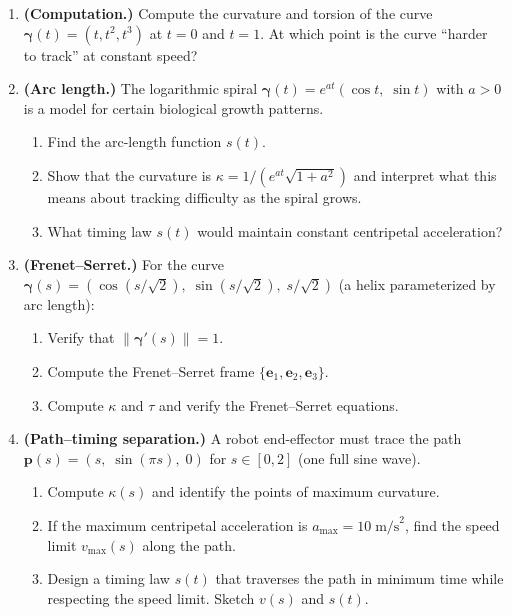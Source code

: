 \documentclass[12pt, openany]{book}
\theoremstyle{plain}
\newcommand{\traj}{\bm{\gamma}}
\newcommand{\norm}[1]{\left\lVert #1 \right\rVert}
\newcommand{\tangent}{\bm{e}_1}
\newcommand{\normal}{\bm{e}_2}
\newcommand{\binormal}{\bm{e}_3}
\begin{document}
\begin{enumerate}[label=\textbf{2.\arabic*.}, leftmargin=1.5cm]

\item \textbf{(Computation.)} Compute the curvature and torsion of the curve
  $\traj(t) = (t, t^2, t^3)$ at $t = 0$ and $t = 1$. At which point is the
  curve ``harder to track'' at constant speed?

\item \textbf{(Arc length.)} The logarithmic spiral $\traj(t) = e^{at}(\cos t,\;
  \sin t)$ with $a > 0$ is a model for certain biological growth patterns.
  \begin{enumerate}[label=(\alph*)]
    \item Find the arc-length function $s(t)$.
    \item Show that the curvature is $\kappa = 1/(e^{at}\sqrt{1 + a^2})$ and
      interpret what this means about tracking difficulty as the spiral grows.
    \item What timing law $s(t)$ would maintain constant centripetal acceleration?
  \end{enumerate}

\item \textbf{(Frenet--Serret.)} For the curve $\traj(s) = (\cos(s/\sqrt{2}),\;
  \sin(s/\sqrt{2}),\; s/\sqrt{2})$ (a helix parameterized by arc length):
  \begin{enumerate}[label=(\alph*)]
    \item Verify that $\norm{\traj'(s)} = 1$.
    \item Compute the Frenet--Serret frame $\{\tangent, \normal, \binormal\}$.
    \item Compute $\kappa$ and $\tau$ and verify the Frenet--Serret equations.
  \end{enumerate}

\item \textbf{(Path--timing separation.)} A robot end-effector must trace the
  path $\bm{p}(s) = (s,\; \sin(\pi s),\; 0)$ for $s \in [0, 2]$
  (one full sine wave).
  \begin{enumerate}[label=(\alph*)]
    \item Compute $\kappa(s)$ and identify the points of maximum curvature.
    \item If the maximum centripetal acceleration is $a_{\max} = 10\;\text{m/s}^2$,
      find the speed limit $v_{\max}(s)$ along the path.
    \item Design a timing law $s(t)$ that traverses the path in minimum time
      while respecting the speed limit. Sketch $v(s)$ and $s(t)$.
  \end{enumerate}


\end{enumerate}
\end{document}
